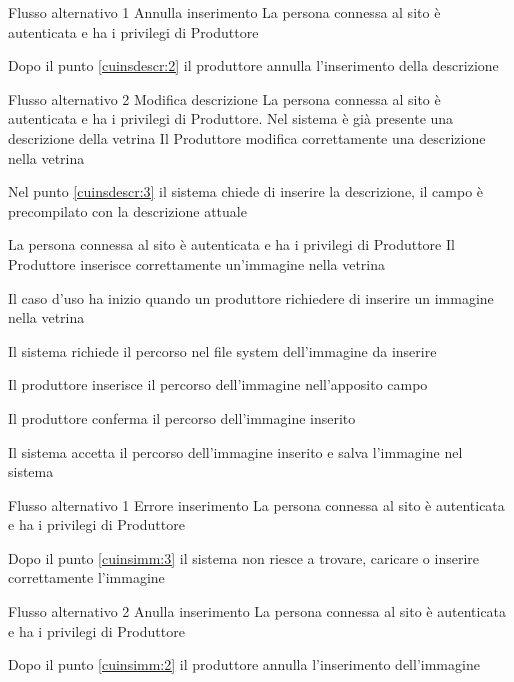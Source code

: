 %
{Flusso alternativo 1}%
{Annulla inserimento}%
{La persona connessa al sito è autenticata e ha i privilegi di Produttore}%
{\postNulle}%
{\begin{enumCU}
		\item Dopo il punto \ref{cuinsdescr:2} il produttore annulla l'inserimento della descrizione
	\end{enumCU}}%
%
{Flusso alternativo 2}%
{Modifica descrizione}%
{La persona connessa al sito è autenticata e ha i privilegi di Produttore. Nel sistema è già presente una descrizione della vetrina}%
{Il Produttore modifica correttamente una descrizione nella vetrina}%
{\begin{enumCU}
		\item Nel punto \ref{cuinsdescr:3} il sistema chiede di inserire la descrizione, il campo è precompilato con la descrizione attuale
	\end{enumCU}}%

\tabcuvspace

{}
{La persona connessa al sito è autenticata e ha i privilegi di Produttore}
{Il Produttore inserisce correttamente un'immagine nella vetrina}
{\begin{enumCU}
		\item Il caso d'uso ha inizio quando un produttore richiedere di inserire un immagine nella vetrina
		\item Il sistema richiede il percorso nel file system dell'immagine da inserire 
		\item Il produttore inserisce il percorso dell'immagine nell'apposito campo \label{cuinsimm:2}
		\item Il produttore conferma il percorso dell'immagine inserito \label{cuinsimm:3}
		\item Il sistema accetta il percorso dell'immagine inserito e salva l'immagine nel sistema
	\end{enumCU}}
%
{Flusso alternativo 1}%
{Errore inserimento}%
{La persona connessa al sito è autenticata e ha i privilegi di Produttore}%
{\postNulle}%
{\begin{enumCU}
		\item Dopo il punto \ref{cuinsimm:3} il sistema non riesce a trovare, caricare o inserire correttamente l'immagine
	\end{enumCU}}%
%
{Flusso alternativo 2}%
{Anulla inserimento}%
{La persona connessa al sito è autenticata e ha i privilegi di Produttore}%
{\postNulle}%
{\begin{enumCU}
		\item Dopo il punto \ref{cuinsimm:2} il produttore annulla l'inserimento dell'immagine
	\end{enumCU}}%

